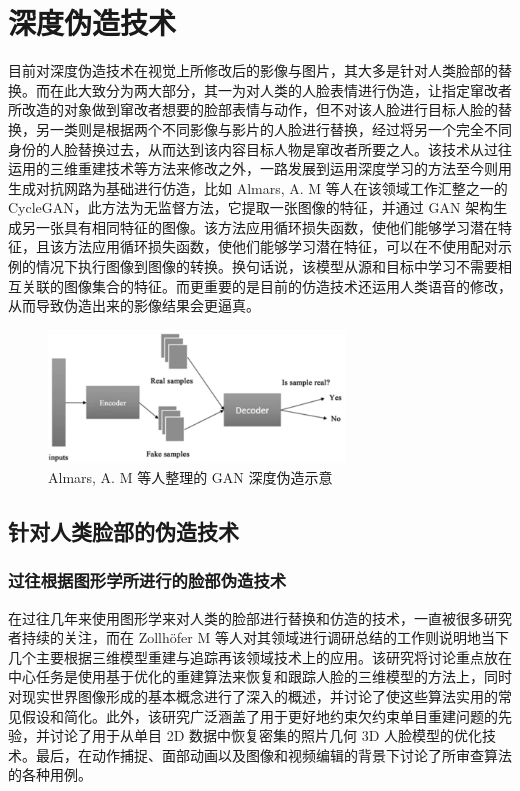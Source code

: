 \section{深度伪造技术}

目前对深度伪造技术在视觉上所修改后的影像与图片，其大多是针对人类脸部的替换。而在此大致分为两大部分，其一为对人类的人脸表情进行伪造，让指定窜改者所改造的对象做到窜改者想要的脸部表情与动作，但不对该人脸进行目标人脸的替换，另一类则是根据两个不同影像与影片的人脸进行替换，经过将另一个完全不同身份的人脸替换过去，从而达到该内容目标人物是窜改者所要之人。该技术从过往运用的三维重建技术等方法来修改之外，一路发展到运用深度学习的方法至今则用生成对抗网路为基础进行仿造，比如 Almars, A. M 等人在该领域工作汇整之一的 CycleGAN，此方法为无监督方法，它提取一张图像的特征，并通过 GAN 架构生成另一张具有相同特征的图像。该方法应用循环损失函数，使他们能够学习潜在特征，且该方法应用循环损失函数，使他们能够学习潜在特征，可以在不使用配对示例的情况下执行图像到图像的转换。换句话说，该模型从源和目标中学习不需要相互关联的图像集合的特征。而更重要的是目前的仿造技术还运用人类语音的修改，从而导致伪造出来的影像结果会更逼真。

\begin{figure}[htb]
\centering 
\includegraphics[width=0.70\textwidth]{img/ch1m2.png} 
\caption{Almars, A. M 等人整理的 GAN 深度伪造示意}
\label{Test}
\end{figure}

\subsection{针对人类脸部的伪造技术}

\subsubsection{过往根据图形学所进行的脸部伪造技术}

在过往几年来使用图形学来对人类的脸部进行替换和仿造的技术，一直被很多研究者持续的关注，而在 Zollhöfer M 等人对其领域进行调研总结的工作则说明地当下几个主要根据三维模型重建与追踪再该领域技术上的应用。该研究将讨论重点放在中心任务是使用基于优化的重建算法来恢复和跟踪人脸的三维模型的方法上，同时对现实世界图像形成的基本概念进行了深入的概述，并讨论了使这些算法实用的常见假设和简化。此外，该研究广泛涵盖了用于更好地约束欠约束单目重建问题的先验，并讨论了用于从单目 2D 数据中恢复密集的照片几何 3D 人脸模型的优化技术。最后，在动作捕捉、面部动画以及图像和视频编辑的背景下讨论了所审查算法的各种用例。

